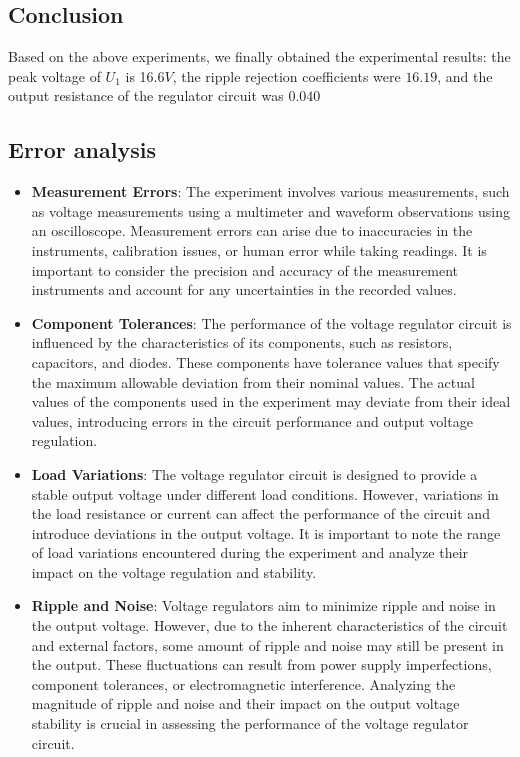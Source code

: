\documentclass[UTF8]{article}
\begin{document}
\subsection{Conclusion}
Based on the above experiments, we finally obtained the experimental results: the peak voltage of $U_1$ is 16.6$V$, the ripple rejection coefficients were $16.19$, and the output resistance of the regulator circuit was $0.040$

\subsection{Error analysis}
\begin{itemize}
\item \textbf{Measurement Errors}: The experiment involves various measurements, such as voltage measurements using a multimeter and waveform observations using an oscilloscope. Measurement errors can arise due to inaccuracies in the instruments, calibration issues, or human error while taking readings. It is important to consider the precision and accuracy of the measurement instruments and account for any uncertainties in the recorded values.

\item \textbf{Component Tolerances}: The performance of the voltage regulator circuit is influenced by the characteristics of its components, such as resistors, capacitors, and diodes. These components have tolerance values that specify the maximum allowable deviation from their nominal values. The actual values of the components used in the experiment may deviate from their ideal values, introducing errors in the circuit performance and output voltage regulation.

\item \textbf{Load Variations}: The voltage regulator circuit is designed to provide a stable output voltage under different load conditions. However, variations in the load resistance or current can affect the performance of the circuit and introduce deviations in the output voltage. It is important to note the range of load variations encountered during the experiment and analyze their impact on the voltage regulation and stability.

\item \textbf{Ripple and Noise}: Voltage regulators aim to minimize ripple and noise in the output voltage. However, due to the inherent characteristics of the circuit and external factors, some amount of ripple and noise may still be present in the output. These fluctuations can result from power supply imperfections, component tolerances, or electromagnetic interference. Analyzing the magnitude of ripple and noise and their impact on the output voltage stability is crucial in assessing the performance of the voltage regulator circuit.


\end{itemize}
\end{document}
